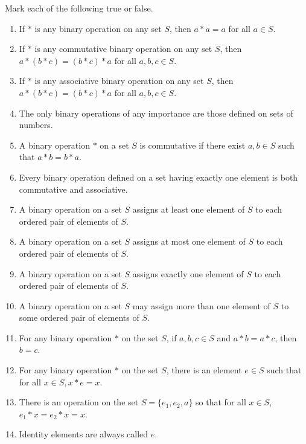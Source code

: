\begin{exercise}
    Mark each of the following true or false.
    \begin{enumerate}[label={\textbf{\alph*.}},itemsep=0pt,topsep=0pt]
        \item If $*$ is any binary operation on any set $S$, then $a * a = a$ for all $a\in S$.
        \item If $*$ is any commutative binary operation on any set $S$, then $a * (b * c) = (b * c) * a$ for all $a, b, c \in S$.
        \item If $*$ is any associative binary operation on any set $S$, then $a * (b * c) = (b * c) * a$ for all $a, b, c \in S$.
        \item The only binary operations of any importance are those defined on sets of numbers.
        \item A binary operation $*$ on a set $S$ is commutative if there exist $a, b \in S$ such that $a * b = b * a$.
        \item Every binary operation defined on a set having exactly one element is both commutative and associative.
        \item A binary operation on a set $S$ assigns at least one element of $S$ to each ordered pair of elements of $S$.
        \item A binary operation on a set $S$ assigns at most one element of $S$ to each ordered pair of elements of $S$.
        \item A binary operation on a set $S$ assigns exactly one element of $S$ to each ordered pair of elements of $S$.
        \item A binary operation on a set $S$ may assign more than one element of $S$ to some ordered pair of elements of $S$.
        \item For any binary operation $*$ on the set $S$, if $a, b, c\in S$ and $a * b = a * c$, then $b = c$.
        \item For any binary operation $*$ on the set $S$, there is an element $e\in S$ such that for all $x\in S, x * e = x$.
        \item There is an operation on the set $S = \{ e_{1}, e_{2}, a \}$ so that for all $x\in S$, $e_{1} * x = e_{2} * x = x$.
        \item Identity elements are always called $e$.
    \end{enumerate}
\end{exercise}

